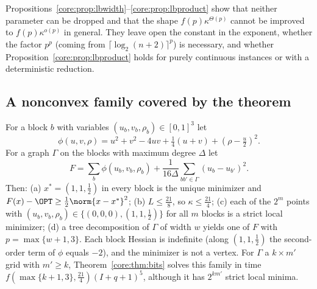 \begin{remark}
Propositions~\ref{core:prop:lbwidth}--\ref{core:prop:lbproduct} show that
neither parameter can be dropped and that the shape $f(p)\kappa^{\Theta(p)}$
cannot be improved to $f(p)\kappa^{o(p)}$ in general. They leave open the
constant in the exponent, whether the factor $p^p$ (coming from
$\lceil\log_2(n+2)\rceil^p$) is necessary, and whether
Proposition~\ref{core:prop:lbproduct} holds for purely continuous instances
or with a deterministic reduction.
\end{remark}

\subsection{A nonconvex family covered by the theorem}\label{core:sec:example}

\begin{example}\label{core:ex:family}
For a block $b$ with variables $(u_b,v_b,\rho_b)\in[0,1]^3$ let
\[
\phi(u,v,\rho)=u^2+v^2-4uv+\tfrac14(u+v)+(\rho-\tfrac u2)^2 .
\]
For a graph $\Gamma$ on the blocks with maximum degree $\Delta$ let
\[
F=\sum_b\phi(u_b,v_b,\rho_b)+\frac1{16\Delta}\sum_{bb'\in\Gamma}(u_b-u_{b'})^2 .
\]
Then: (a) $x^*=(1,1,\frac12)$ in every block is the unique minimizer and
$F(x)-\OPT\ge\frac12\norm{x-x^*}^2$; (b) $L\le\frac{21}8$, so
$\kappa\le\frac{21}4$; (c) each of the $2^m$ points with
$(u_b,v_b,\rho_b)\in\{(0,0,0),(1,1,\frac12)\}$ for all $m$ blocks is a strict
local minimizer; (d) a tree decomposition of $\Gamma$ of width $w$ yields one
of $F$ with $p=\max\{w+1,3\}$. Each block Hessian is indefinite (along
$(1,1,\frac12)$ the second-order term of $\phi$ equals $-2$), and the
minimizer is not a vertex. For $\Gamma$ a $k\times m'$ grid with $m'\ge k$,
Theorem~\ref{core:thm:bits} solves this family in time
$f(\max\{k+1,3\},\frac{21}4)(I+q+1)^5$, although it has $2^{km'}$ strict
local minima.
\end{example}

